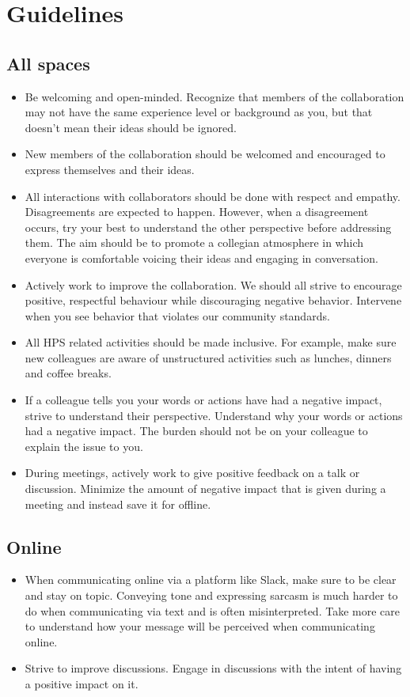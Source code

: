 \documentclass[10pt]{article}
\begin{document}
\section{Guidelines}

\subsection{All spaces}
\begin{itemize}
    \item Be welcoming and open-minded.  Recognize that members of the 
      collaboration may not have the same experience level or background as 
      you, but that doesn't mean their ideas should be ignored. 
    \item New members of the collaboration should be welcomed and encouraged 
      to express themselves and their ideas. 
    \item All interactions with collaborators should be done with respect and 
      empathy. Disagreements are expected to happen.  However, when a disagreement
      occurs, try your best to understand the other perspective before addressing 
      them.  The aim should be to promote a collegian atmosphere in which 
      everyone is comfortable voicing their ideas and engaging in conversation.
    \item Actively work to improve the collaboration. We should all strive to 
      encourage positive, respectful behaviour while discouraging negative 
      behavior. Intervene when you see behavior that violates our community 
      standards. 
    \item All HPS related activities should be made inclusive. For example, 
      make sure new colleagues are aware of unstructured activities such as lunches, 
      dinners and coffee breaks.
    \item If a colleague tells you your words or actions have had a negative 
      impact, strive to understand their perspective.  Understand why your words
      or actions had a negative impact.  The burden should not be on your colleague 
      to explain the issue to you. 
    \item During meetings, actively work to give positive feedback on a talk 
      or discussion.  Minimize the amount of negative impact that is given during
      a meeting and instead save it for offline. 
\end{itemize}

\subsection{Online}
\begin{itemize}
    \item When communicating online via a platform like Slack, make sure to 
    be clear and stay on topic.  Conveying tone and expressing sarcasm is much
    harder to do when communicating via text and is often misinterpreted. Take 
    more care to understand how your message will be perceived when 
    communicating online.
    \item Strive to improve discussions.  Engage in discussions with the 
    intent of having a positive impact on it.  
\end{itemize}
\end{document}
